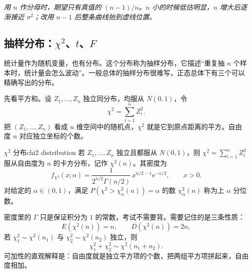 \begin{center}
\begin{minipage}{\linewidth}
\centering
{}
\par\vspace{2pt}
{\footnotesize\itshape 用 $n$ 作分母时，期望只有真值的 $(n-1)/n$。$n$ 小的时候低估明显，$n$ 增大后逐渐接近 $\sigma^2$；改用 $n-1$ 后整条曲线抬到虚线位置。}
\end{minipage}
\end{center}

\subsection{抽样分布：$\chi^2$、$t$、$F$}

统计量作为随机变量，也有分布。这个分布称为抽样分布，它描述“重复抽 $n$ 个样本时，统计量会怎么波动”。一般总体的抽样分布很难写，正态总体下有三个可以精确写出的分布。

先看平方和。设 $Z_1,\dots,Z_n$ 独立同分布，均服从 $N(0,1)$，令
\[
    \chi^2=\sum_{i=1}^{n}Z_i^2.
\]
把 $(Z_1,\dots,Z_n)$ 看成 $n$ 维空间中的随机点，$\chi^2$ 就是它到原点距离的平方。自由度 $n$ 对应独立坐标的个数。

\begin{mydef}{$\chi^2$ 分布}{chi2 distribution}
    若 $Z_1,\dots,Z_n$ 独立且都服从 $N(0,1)$，则 $\chi^2=\sum_{i=1}^{n}Z_i^2$ 服从自由度为 $n$ 的卡方分布，记作 $\chi^2(n)$。其密度为
    \[
        f_{\chi^2}(x;n)=\frac{1}{2^{n/2}\Gamma(n/2)}\,x^{n/2-1}\mathrm{e}^{-x/2},
        \qquad x>0.
    \]
    对给定的 $\alpha\in(0,1)$，满足 $P(\chi^2>\chi^2_{\alpha}(n))=\alpha$ 的数 $\chi^2_{\alpha}(n)$ 称为上 $\alpha$ 分位数。
\end{mydef}

密度里的 $\Gamma$ 只是保证积分为 $1$ 的常数，考试不需要背。需要记住的是三条性质：
\[
    E(\chi^2(n))=n,\qquad D(\chi^2(n))=2n,
\]
若 $\chi_1^2\sim\chi^2(n_1)$ 与 $\chi_2^2\sim\chi^2(n_2)$ 独立，则
\[
    \chi_1^2+\chi_2^2\sim\chi^2(n_1+n_2).
\]
可加性的直观解释是：自由度就是独立平方项的个数，把两组平方项拼起来，自由度相加。


